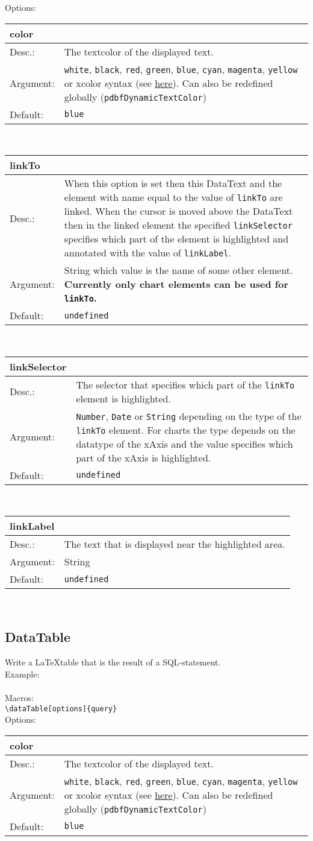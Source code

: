 \documentclass[11pt]{article}
\def\a{5cm}
\def\b{10.5cm}
\def\option#1#2#3#4{%
\noindent \begin{tabular}{|p{\a}|p{\b}|}
\hline
\textbf{#1} & \\
\hline
Desc.: & #2 \\
\hline
Argument: & #3\\
\hline
Default:& #4\\
\hline
\end{tabular} \\[4pt]%
}
\begin{document}
\noindent Options: \\[3pt]

\option
{color}
{The textcolor of the displayed text.}
{\texttt{white}, \texttt{black}, \texttt{red}, \texttt{green}, \texttt{blue}, \texttt{cyan}, \texttt{magenta}, \texttt{yellow} or xcolor syntax (see \href{http://mirror.unicorncloud.org/CTAN/macros/latex/contrib/xcolor/xcolor.pdf}{here}). Can also be redefined globally (\texttt{pdbfDynamicTextColor})}
{\texttt{blue}}

\option
{linkTo}
{When this option is set then this DataText and the element with name equal to the value of \texttt{linkTo} are linked. When the cursor is moved above the DataText then in the linked element the specified \texttt{linkSelector} specifies which part of the element is highlighted and annotated with the value of \texttt{linkLabel}.}
{String which value is the name of some other element. \textbf{Currently only chart elements can be used for \texttt{linkTo}.}}
{\texttt{undefined}}

\option
{linkSelector}
{The selector that specifies which part of the \texttt{linkTo} element is highlighted.}
{\texttt{Number}, \texttt{Date} or \texttt{String} depending on the type of the \texttt{linkTo} element. For charts the type depends on the datatype of the xAxis and the value specifies which part of the xAxis is highlighted.}
{\texttt{undefined}}

\option
{linkLabel}
{The text that is displayed near the highlighted area.}
{String}
{\texttt{undefined}}

\subsection{DataTable}
Write a \LaTeX\space table that is the result of a SQL-statement.\\[3pt]
Example:\\[3pt]
\\[5pt]
%
\noindent Macros: \\[3pt]
\verb|\dataTable[options]{query}| \\[8pt]

\noindent Options: \\[3pt]

\option
{color}
{The textcolor of the displayed text.}
{\texttt{white}, \texttt{black}, \texttt{red}, \texttt{green}, \texttt{blue}, \texttt{cyan}, \texttt{magenta}, \texttt{yellow} or xcolor syntax (see \href{http://mirror.unicorncloud.org/CTAN/macros/latex/contrib/xcolor/xcolor.pdf}{here}). Can also be redefined globally (\texttt{pdbfDynamicTextColor})}
{\texttt{blue}}
\end{document}
